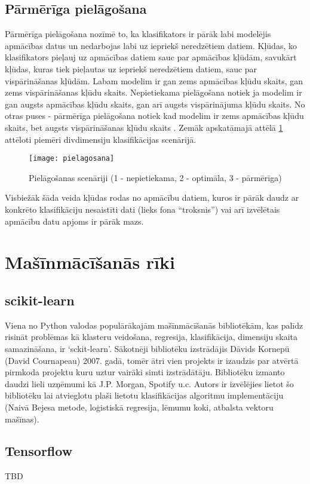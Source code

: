 \subsection{Pārmērīga pielāgošana}
Pārmērīga pielāgošana nozīmē to, ka klasifikators ir pārāk labi modelējis apmācības datus
un nedarbojas labi uz iepriekš neredzētiem datiem. Kļūdas, ko klasifikators pieļauj uz apmācības datiem sauc par apmācības kļūdām, savukārt kļūdas, kuras tiek pieļautas uz iepriekš neredzētiem datiem, sauc par vispārināšanas kļūdām. Labam modelim ir gan zems apmācības kļūdu skaits, gan zems vispārināšanas kļūdu skaits. Nepietiekama pielāgošana notiek ja modelim ir gan augsts apmācības kļūdu skaits, gan arī augsts vispārinājuma kļūdu skaits. No otras puses - pārmērīga pielāgošana notiek kad modelim ir zems apmācības kļūdu skaits, bet augsts vispārināšanas kļūdu skaits \cite{tan2005introduction}. Zemāk apskatāmajā attēlā \ref{fig:pielagosana} attēloti piemēri divdimensiju klasifikācijas scenārijā.

\begin{figure}[H]
	\texttt{[image: pielagosana]}
	\caption{Pielāgošanas scenāriji (1 - nepietiekama, 2 - optimāla, 3 - pārmērīga)}
	\label{fig:pielagosana}
\end{figure}
 
Visbiežāk šāda veida kļūdas rodas no apmācību datiem, kuros ir pārāk daudz ar konkrēto klasifikāciju nesaistīti dati (lieks fona “troksnis”) vai arī izvēlētais apmācību datu apjoms ir pārāk mazs.

\newpage
\section{Mašīnmācīšanās rīki}
\subsection{scikit-learn}
Viena no Python valodas populārākajām mašīnmācīšanās bibliotēkām, kas palīdz risināt problēmas kā klasteru veidošana, regresija, klasifikācija, dimensiju skaita samazināšana, ir ‘sckit-learn’. Sākotnēji bibliotēku izstrādājis Dāvids Kornepū (David Cournapeau) 2007. gadā, tomēr ātri vien projekts ir izaudzis par atvērtā pirmkoda projektu kuru uztur vairāki simti izstrādātāju.  Bibliotēku izmanto daudzi lieli uzņēmumi kā J.P. Morgan, Spotify u.c. Autors ir izvēlējies lietot šo bibliotēku lai atvieglotu plaši lietotu klasifikācijas algoritmu implementāciju (Naivā Bejesa metode, loģistiskā regresija, lēmumu koki,  atbalsta vektoru mašīnas). 
\subsection{Tensorflow}
TBD
